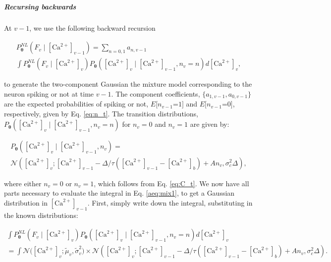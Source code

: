 \documentclass[10pt]{article}
\providecommand{\ve}[1]{\boldsymbol{#1}}
\providecommand{\ve}[1]{\boldsymbol{#1}}
\newcommand{\thetn}{\ve{\theta}}
\newcommand{\p}{P_{\thetn}}
\newcommand{\Ca}{[\text{Ca}^{2+}]}
\begin{document}
%

\subparagraph{Recursing backwards}

At $v-1$, we use the following backward recursion

\begin{multline} \label{aeq:mix1}
\p^{NL}(F_v \mid \Ca_{v-1}) = \sum_{n=0,1} a_{n,v-1} \\
\int \p^{NL}(F_v \mid \Ca_v) \p(\Ca_v \mid \Ca_{v-1}, n_v=n) d\Ca_v,
\end{multline}

\noindent to generate the two-component Gaussian the mixture model corresponding to the neuron spiking or not at time $v-1$. The component coefficients, $\{a_{1,v-1},a_{0,v-1}\}$ are the expected probabilities of spiking or not, $E[n_{v-1}$=$1]$ and $E[n_{v-1}$=$0]$, respectively, given by Eq. \ref{eq:n_t}.  The transition distributions, $\p(\Ca_v \mid \Ca_{v-1}, n_v=n)$ for $n_v=0$ and $n_v=1$ are given by:

\begin{multline}
\p(\Ca_v \mid \Ca_{v-1}, n_v) =\\
\mathcal{N}(\Ca_v; \Ca_{v-1} -\Delta/\tau (\Ca_{v-1} - \Ca_b) + A n_v, \sigma_c^2 \Delta),
\end{multline}

\noindent where either $n_v=0$ or $n_v=1$, which follows from Eq. \ref{eq:C_t}. We now have all parts necessary to evaluate the integral in Eq. \ref{aeq:mix1}, to get a Gaussian distribution in $\Ca_{v-1}$.  First, simply write down the integral, substituting in the known distributions:

\begin{multline} \label{aeq:2n}
\int \p^{NL}(F_v \mid \Ca_v) \p(\Ca_v \mid \Ca_{v-1}, n_v=n) d\Ca_v
\\= \int \mathcal{N}\big(\Ca_v; \widetilde{\mu}_v, \widetilde{\sigma}_v^2\big)  \times \mathcal{N}(\Ca_v; \Ca_{v-1} -\Delta/\tau (\Ca_{v-1} - \Ca_b) + A n_v, \sigma_c^2 \Delta).
\end{multline}
\end{document}

